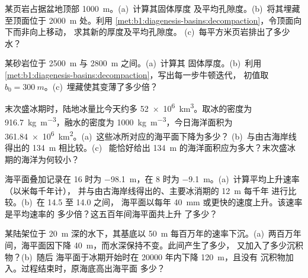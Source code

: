 \begin{exercise}[$\star\star$]\label{exo:b1:diagenesis-basins:5}
某页岩占据盆地顶部 \qty{1000}{m}。(a)~计算其固体厚度
及平均孔隙度。(b)~将其埋藏至顶面位于
\qty{2000}{m} 处。利用 \cref{met:b1:diagenesis-basins:decompaction}，令顶面向下而非向上移动，
求其新的厚度及平均孔隙度。
(c)~每平方米页岩排出了多少水？
\end{exercise}

\begin{exercise}[$\star\star$]\label{exo:b1:diagenesis-basins:6}
某砂岩位于 \qty{2500}{m} 与 \qty{2800}{m} 之间。(a)~计算其
固体厚度。(b)~利用
\cref{met:b1:diagenesis-basins:decompaction}，写出每一步牛顿迭代，
初值取 $b_0 = \qty{300}{m}$。(c)~埋藏使其变薄了多少倍？
\end{exercise}

\begin{exercise}[$\star\star$]\label{exo:b1:diagenesis-basins:7}
末次盛冰期时，陆地冰量比今天约多
\qty{52e6}{km^3}。取冰的密度为 \qty{916.7}{kg.m^{-3}}，融水的密度为
\qty{1000}{kg.m^{-3}}，今日海洋面积为
\qty{361.84e6}{km^2}。(a)~这些冰所对应的海平面下降为多少？
(b)~与由古海岸线得出的 \qty{134}{m} 相比较。(c)~
能恰好给出 \qty{134}{m} 的海洋面积应为多大？末次盛冰期的海洋为何较小？
\end{exercise}

\begin{exercise}[$\star\star$]\label{exo:b1:diagenesis-basins:8}
海平面叠加记录在 \qty{16}{\ka} 时为 \qty{-98.1}{m}，在
\qty{8}{\ka} 时为 \qty{-9.1}{m}。(a)~计算平均上升速率（以米每千年计），
并与由古海岸线得出的、主要冰消期的 \qty{12}{m} 每千年
进行比较。(b)~在 \qty{14.5}{\ka} 至 \qty{14.0}{\ka} 之间，
海平面以每年 \qty{40}{mm} 或更快的速度上升。该速率是平均速率的
多少倍？这五百年间海平面共上升
了多少？
\end{exercise}

\begin{exercise}[$\star\star$]\label{exo:b1:diagenesis-basins:9}
某陆架位于 \qty{20}{m} 深的水下，其基底以
\qty{50}{m} 每百万年的速率下沉。(a)~两百万年间，海平面因下降
\qty{40}{m}，而水深保持不变。此间产生了多少，
又加入了多少沉积物？(b)~随后
海平面于冰期开始时在 \num{20000} 年内下降 \qty{120}{m}，且没有
沉积物加入。过程结束时，原海底高出海平面
多少？
\end{exercise}

